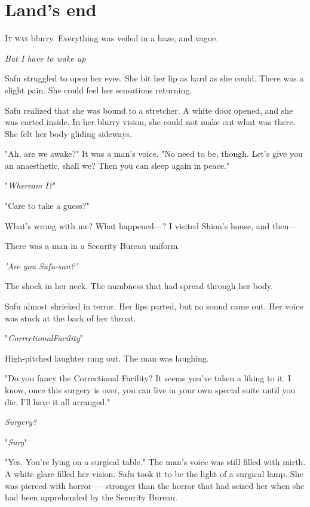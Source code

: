 
\chapter{Land's end}


\lettrine{I}{t was} blurry. Everything was veiled in a haze, and vague.

\emph{But I have to wake up\el }

Safu struggled to open her eyes. She bit her lip as hard as she could.
There was a slight pain. She could feel her sensations returning.

Safu realized that she was bound to a stretcher. A white door opened,
and she was carted inside. In her blurry vision, she could not make out
what was there. She felt her body gliding sideways.

"Ah, are we awake?" It was a man's voice. "No need to be, though. Let's
give you an anaesthetic, shall we? Then you can sleep again in peace."

"\emph{Where\el am I\el ?}"

"Care to take a guess?"

What's wrong with me? What happened---? I visited Shion's house, and then---

There was a man in a Security Bureau uniform.

\emph{'Are you Safu-san?'}

The shock in her neck. The numbness that had spread through her body.

Safu almost shrieked in terror. Her lips parted, but no sound came out.
Her voice was stuck at the back of her throat.

"\emph{Correc\el tional\el Facility\el }"

High-pitched laughter rang out. The man was laughing.

"Do you fancy the Correctional Facility? It seems you've taken a liking
to it. I know, once this surgery is over, you can live in your own
special suite until you die. I'll have it all arranged."

\emph{Surgery?}

"\emph{Surg\el }"

"Yes. You're lying on a surgical table." The man's voice was still
filled with mirth. A white glare filled her vision. Safu took it to be
the light of a surgical lamp. She was pierced with horror --- stronger
than the horror that had seized her when she had been apprehended by the
Security Bureau.

